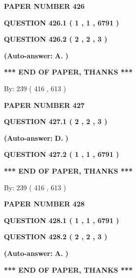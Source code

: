\documentclass[12pt]{article}
\begin{document}
   
 {\textbf{ \Large{ PAPER NUMBER  426  }}}
   
   
   
   
  
  
{\textbf{\large{QUESTION
426.1 
 ( 1 , 1 , 6791 )
}}}
  
  
{\textbf{\large{QUESTION
426.2 
 ( 2 , 2 , 3 )
}}}
 
 
{\textbf{(Auto-answer:}}
{\textbf{\large{
A.}}}
{\textbf{)}}
 
 
   
   
   
   
\vspace{1.0in} 
{\textbf{\large{ *** END OF PAPER, THANKS *** }}} 
   
   
\hspace{1.0in} By: 
 239 ( 416 ,  613 )
   
   
   
   
\newpage 
\setcounter{page}{ 
   427001 } 
   
   
 {\textbf{ \Large{ PAPER NUMBER  427  }}}
   
   
   
   
  
  
{\textbf{\large{QUESTION
427.1 
 ( 2 , 2 , 3 )
}}}
 
 
{\textbf{(Auto-answer:}}
{\textbf{\large{
D.}}}
{\textbf{)}}
 
 
  
  
{\textbf{\large{QUESTION
427.2 
 ( 1 , 1 , 6791 )
}}}
   
   
   
   
\vspace{1.0in} 
{\textbf{\large{ *** END OF PAPER, THANKS *** }}} 
   
   
\hspace{1.0in} By: 
 239 ( 416 ,  613 )
   
   
   
   
\newpage 
\setcounter{page}{ 
   428001 } 
   
   
 {\textbf{ \Large{ PAPER NUMBER  428  }}}
   
   
   
   
  
  
{\textbf{\large{QUESTION
428.1 
 ( 1 , 1 , 6791 )
}}}
  
  
{\textbf{\large{QUESTION
428.2 
 ( 2 , 2 , 3 )
}}}
 
 
{\textbf{(Auto-answer:}}
{\textbf{\large{
A.}}}
{\textbf{)}}
 
 
   
   
   
   
\vspace{1.0in} 
{\textbf{\large{ *** END OF PAPER, THANKS *** }}} 
   
\end{document}
